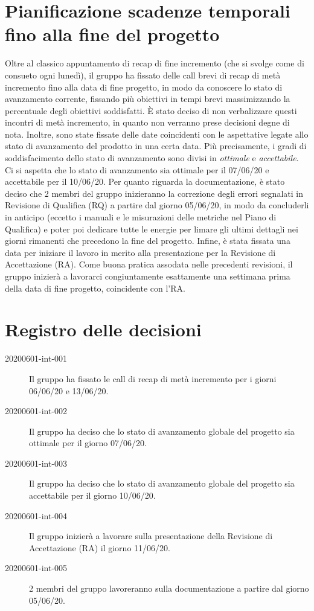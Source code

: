 \documentclass{article}
\begin{document}
\section{Pianificazione scadenze temporali fino alla fine del progetto}%
\label{sec:pianificazione_scadenze_temporali_fino_alla_fine_del_progetto}
Oltre al classico appuntamento di recap di fine incremento (che si svolge come di consueto ogni lunedì), il gruppo ha fissato delle call brevi di recap di metà incremento fino alla data di fine progetto, in modo da conoscere lo stato di avanzamento corrente, fissando più obiettivi in tempi brevi massimizzando la percentuale degli obiettivi soddisfatti. È stato deciso di non verbalizzare questi incontri di metà incremento, in quanto non verranno prese decisioni degne di nota.
Inoltre, sono state fissate delle date coincidenti con le aspettative legate allo stato di avanzamento del prodotto in una certa data. Più precisamente, i gradi di soddisfacimento dello stato di avanzamento sono divisi in \textit{ottimale} e \textit{accettabile}. Ci si aspetta che lo stato di avanzamento sia ottimale per il 07/06/20 e accettabile per il 10/06/20.
Per quanto riguarda la documentazione, è stato deciso che 2 membri del gruppo inizieranno la correzione degli errori segnalati in Revisione di Qualifica (RQ) a partire dal giorno 05/06/20, in modo da concluderli in anticipo (eccetto i manuali e le misurazioni delle metriche nel Piano di Qualifica) e poter poi dedicare tutte le energie per limare gli ultimi dettagli nei giorni rimanenti che precedono la fine del progetto.
Infine, è stata fissata una data per iniziare il lavoro in merito alla presentazione per la Revisione di Accettazione (RA). Come buona pratica assodata nelle precedenti revisioni, il gruppo inizierà a lavorarci congiuntamente esattamente una settimana prima della data di fine progetto, coincidente con l'RA\@.

\newpage
\section{Registro delle decisioni}%
\label{sec:registro_delle_decisioni}

\begin{description}
  \item[20200601-int-001] Il gruppo ha fissato le call di recap di metà incremento per i giorni 06/06/20 e 13/06/20.
  \item[20200601-int-002] Il gruppo ha deciso che lo stato di avanzamento globale del progetto sia ottimale per il giorno 07/06/20.
  \item[20200601-int-003] Il gruppo ha deciso che lo stato di avanzamento globale del progetto sia accettabile per il giorno 10/06/20.
  \item[20200601-int-004] Il gruppo inizierà a lavorare sulla presentazione della Revisione di Accettazione (RA) il giorno 11/06/20.
  \item[20200601-int-005] 2 membri del gruppo lavoreranno sulla documentazione a partire dal giorno 05/06/20.
\end{description}

\end{document}
